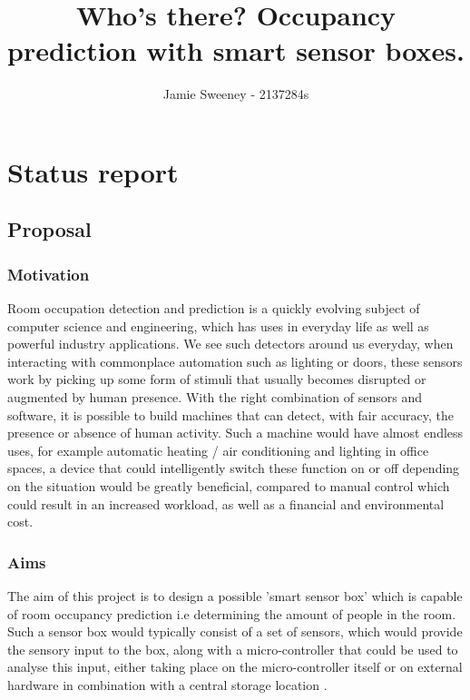 \documentclass[11pt]{article}
\title{Who's there? Occupancy prediction with smart sensor boxes.}
\author{Jamie Sweeney - 2137284s}
\begin{document}
    \maketitle
    



\section{Status report}

\subsection{Proposal}\label{proposal}

\subsubsection{Motivation}\label{motivation}
Room occupation detection and prediction is a quickly evolving subject of computer science and engineering, which has uses in everyday life as well as powerful industry applications. We see such detectors around us everyday, when interacting with commonplace automation such as lighting or doors, these sensors work by picking up some form of stimuli that usually becomes disrupted or augmented by human presence. With the right combination of sensors and software, it is possible to build machines that can detect, with fair accuracy, the presence or absence of human activity. Such a machine would have almost endless uses, for example automatic heating / air conditioning and lighting in office spaces, a device that could intelligently switch these function on or off depending on the situation would be greatly beneficial, compared to manual control which could result in an increased workload, as well as a financial and environmental cost.

\subsubsection{Aims}\label{aims}
The aim of this project is to design a possible 'smart sensor box' which is capable of room occupancy prediction i.e determining the amount of people in the room. Such a sensor box would typically consist of a set of sensors, which would provide the sensory input to the box, along with a micro-controller that could be used to analyse this input, either taking place on the micro-controller itself or on external hardware in combination with a central storage location \cite{ref1}.
\end{document}
